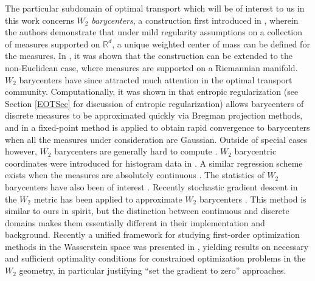 \documentclass{article}
\newcommand{\R}{\mathbb{R}}
\begin{document}
The particular subdomain of optimal transport which will be of interest to us in this work concerns \emph{\(W_2\) barycenters}, a construction first introduced in \cite{aguehBarycentersWassersteinSpace2010}, wherein the authors demonstrate that under mild regularity assumptions on a collection of measures supported on \(\R^d\), a unique weighted center of mass can be defined for the measures.  In \cite{kimWassersteinBarycentersRiemannian2017}, it was shown that the construction can be extended to the non-Euclidean case, where measures are supported on a Riemannian manifold. \(W_2\) barycenters have since attracted much attention in the optimal transport community. Computationally, it was shown in \cite{benamou2015iterative} that entropic regularization (see Section \ref{EOTSec} for discussion of entropic regularization) allows barycenters of discrete measures to be approximated quickly via Bregman projection methods, and in \cite{alvarez-estebanFixedpointApproachBarycenters2016} a fixed-point method is applied to obtain rapid convergence to barycenters when all the measures under consideration are Gaussian. 
Outside of special cases however, \(W_2\) barycenters are generally hard to compute \cite{altschuler2022wasserstein}. \(W_2\) barycentric coordinates were introduced for histogram data in \cite{bonneelWassersteinBarycentricCoordinates2016}. A similar regression scheme exists when the measures are absolutely continuous \cite{werenskiMeasureEstimationBarycentric2022}. The statistics of \(W_2\) barycenters have also been of interest \cite{zemelFrechetMeansProcrustes2019, panaretosInvitationStatisticsWasserstein2020}. Recently stochastic gradient descent in the \(W_2\) metric has been applied to approximate \(W_2\) barycenters \cite{backhoffStochasticGradientDescent2025}. This method is similar to ours in spirit, but the distinction between continuous and discrete domains makes them essentially different in their implementation and background.  Recently a unified framework for studying first-order optimization methods in the Wasserstein space was presented in \cite{lanzettiFirstOrderConditionsOptimization2025}, yielding results on necessary and sufficient optimality conditions for constrained optimization problems in the \(W_2\) geometry, in particular justifying ``set the gradient to zero'' approaches.
\end{document}
